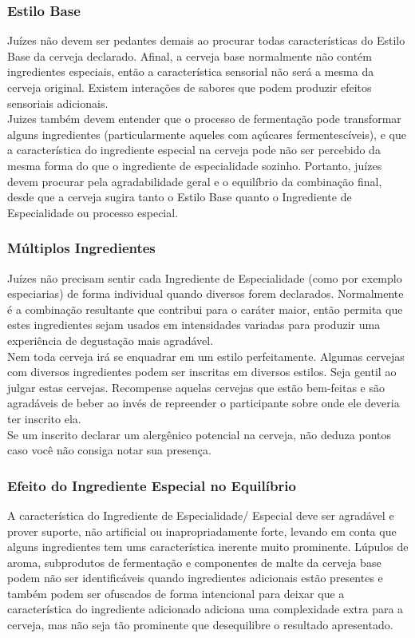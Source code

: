 \subsubsection*{Estilo Base}
Juízes não devem ser pedantes demais ao procurar todas características do Estilo Base da cerveja declarado. Afinal, a cerveja base normalmente não contém ingredientes especiais, então a característica sensorial não será a mesma da cerveja original. Existem interações de sabores que podem produzir efeitos sensoriais adicionais.\\
Juizes também devem entender que o processo de fermentação pode transformar alguns ingredientes (particularmente aqueles com açúcares fermentescíveis), e que a característica do ingrediente especial na cerveja pode não ser percebido da mesma forma do que o ingrediente de especialidade sozinho. Portanto, juízes devem procurar pela agradabilidade geral e o equilíbrio da combinação final, desde que a cerveja sugira tanto o Estilo Base quanto o Ingrediente de Especialidade ou processo especial.
\subsubsection*{Múltiplos Ingredientes}
Juízes não precisam sentir cada Ingrediente de Especialidade (como por exemplo especiarias) de forma individual quando diversos forem declarados. Normalmente é a combinação resultante que contribui para o caráter maior, então permita que estes ingredientes sejam usados em intensidades variadas para produzir uma experiência de degustação mais agradável.\\
Nem toda cerveja irá se enquadrar em um estilo perfeitamente. Algumas cervejas com diversos ingredientes podem ser inscritas em diversos estilos. Seja gentil ao julgar estas cervejas. Recompense aquelas cervejas que estão bem-feitas e são agradáveis de beber ao invés de repreender o participante sobre onde ele deveria ter inscrito ela.\\
Se um inscrito declarar um alergênico potencial na cerveja, não deduza pontos caso você não consiga notar sua presença.

\subsubsection*{Efeito do Ingrediente Especial no Equilíbrio}
A característica do Ingrediente de Especialidade/ Especial deve ser agradável e prover suporte, não artificial ou inapropriadamente forte, levando em conta que alguns ingredientes tem ums característica inerente muito prominente.  Lúpulos de aroma, subprodutos de fermentação e componentes de malte da cerveja base podem não ser identificáveis quando ingredientes adicionais estão presentes e também podem ser ofuscados de forma intencional para deixar que a característica do ingrediente adicionado adiciona uma complexidade extra para a cerveja, mas não seja tão prominente que desequilibre o resultado apresentado.